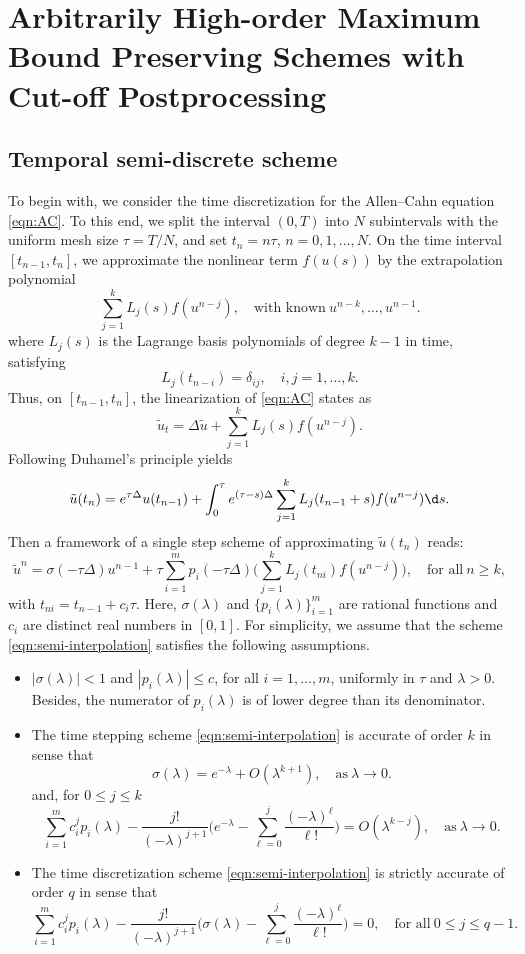 \chapter[Cut-Off Runge--Kutta]{Arbitrarily High-order Maximum Bound Preserving Schemes with Cut-off Postprocessing}


\section{Temporal semi-discrete scheme}
To begin with, we consider the time discretization for the Allen--Cahn equation \eqref{eqn:AC}.
To this end, we split the interval $(0,T)$ into $N$ subintervals with the uniform mesh size $\tau=T/N$,
and set $t_n = n\tau$, $n=0,1,\ldots,N$.
On the time interval $[t_{n-1},t_n]$, we approximate the nonlinear term $f(u(s))$ by the extrapolation polynomial
$$
 \sum_{j=1}^{k} L_j(s) f(u^{n-j}),\quad \text{with known}~ u^{n-k},\ldots,u^{n-1}.
$$
where $L_j(s)$ is the Lagrange basis polynomials of degree $k-1$ in time, satisfying
$$
L_j(t_{n-i}) = \delta_{ij}, \quad i,j=1,\dots,k.
$$
Thus, on $[t_{n-1},t_n]$, the linearization of \eqref{eqn:AC} states as
$$\tilde{u}_t=\Delta\tilde{u}+\sum_{j=1}^{k} L_j(s) f(u^{n-j}).$$
Following Duhamel's principle yields
$$\tilde{u}(t_{n})=e^{\tau\Delta}u(t_{n-1})+\int_0^\tau e^{(\tau-s)\Delta}\sum_{j=1}^{k} L_j(t_{n-1}+s) f(u^{n-j})\d s.$$
Then a framework of a single step scheme of approximating $\tilde{u}(t_{n})$ reads:
\begin{equation}\label{eqn:semi-interpolation}
\tilde u^{n} = \sigma(-\tau\Delta) u^{n-1} + \tau \sum_{i=1}^m p_i(-\tau \Delta)
\Big(\sum_{j=1}^{k} L_j (t_{ni}) f(u^{n-j})\Big),\quad \text{for all}~n\ge k,
\end{equation}
with $t_{ni}=t_{n-1} + c_i\tau$.
Here,
$\sigma(\lambda)$ and $\{p_i(\lambda)\}^m_{i=1}$ are rational functions and $c_i$ are distinct real numbers in $[0,1]$.
For simplicity, we assume that the scheme \eqref{eqn:semi-interpolation} satisfies the following assumptions.

\begin{itemize}
\item[{\bf (P1)}] $|\sigma(\lambda)|< 1$ and $|p_i(\lambda)|\le c$, for all $i=1,\ldots,m$,
uniformly in $\tau$ and $\lambda > 0$. Besides, the numerator of $p_i(\lambda)$
is of lower degree than its denominator.
\item[{\bf (P2)}] The time stepping scheme \eqref{eqn:semi-interpolation}  is accurate of order $k$ in sense that
$$ \sigma(\lambda) = e^{-\lambda} + O(\lambda^{k+1}),\quad \text{as}~\lambda\rightarrow0. $$
and, for $0\le j\le k$
$$ \sum_{i=1}^m c_i^j p_i(\lambda) - \frac{j!}{(-\lambda)^{j+1}}\Big(e^{-\lambda}
- \sum_{\ell=0}^j \frac{(-\lambda)^\ell}{\ell!}\Big) = O(\lambda^{k-j}),\quad \text{as}~\lambda\rightarrow0. $$
\item[{\bf (P3)}] The time discretization scheme \eqref{eqn:semi-interpolation} is strictly accurate of order $q$ in sense that
$$ \sum_{i=1}^m c_i^j p_i(\lambda) - \frac{j!}{(-\lambda)^{j+1}}\Big(\sigma(\lambda)
- \sum_{\ell=0}^j \frac{(-\lambda)^\ell}{\ell!}\Big) =0,\quad\text{for all}~ 0\le j\le q-1. $$
\end{itemize}

